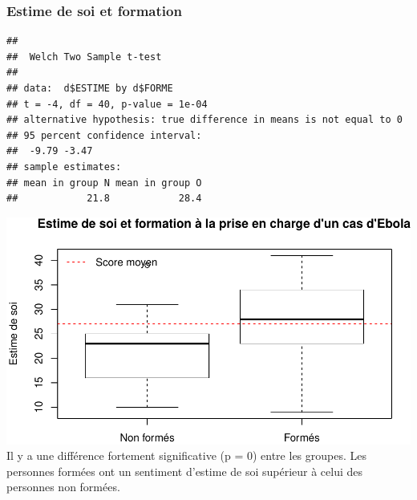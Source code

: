 \documentclass[]{article}
\newenvironment{Shaded}{\begin{snugshade}}{\end{snugshade}}
\newcommand{\KeywordTok}[1]{\textcolor[rgb]{0.13,0.29,0.53}{\textbf{{#1}}}}
\newcommand{\DataTypeTok}[1]{\textcolor[rgb]{0.13,0.29,0.53}{{#1}}}
\newcommand{\DecValTok}[1]{\textcolor[rgb]{0.00,0.00,0.81}{{#1}}}
\newcommand{\StringTok}[1]{\textcolor[rgb]{0.31,0.60,0.02}{{#1}}}
\newcommand{\NormalTok}[1]{{#1}}
\begin{document}
\subsubsection{Estime de soi et
formation}\label{estime-de-soi-et-formation}

\begin{Shaded}
\end{Shaded}

\begin{verbatim}
## 
##  Welch Two Sample t-test
## 
## data:  d$ESTIME by d$FORME
## t = -4, df = 40, p-value = 1e-04
## alternative hypothesis: true difference in means is not equal to 0
## 95 percent confidence interval:
##  -9.79 -3.47
## sample estimates:
## mean in group N mean in group O 
##            21.8            28.4
\end{verbatim}

\begin{Shaded}
\end{Shaded}

\includegraphics{analyse_files/figure-latex/unnamed-chunk-27-1.pdf} Il y
a une différence fortement significative (p = 0) entre les groupes. Les
personnes formées ont un sentiment d'estime de soi supérieur à celui des
personnes non formées.
\end{document}
